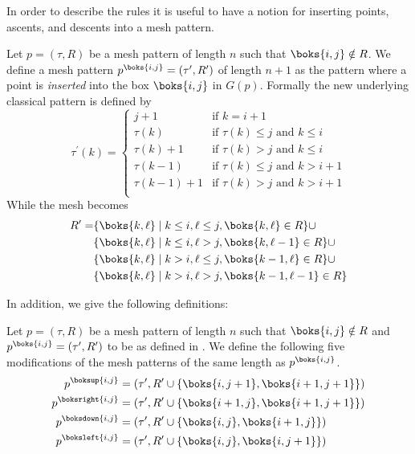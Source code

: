 In order to describe the rules it is useful to have a notion for inserting points, ascents, and
descents into a mesh pattern.
\begin{definition}
\label{def:ap}
Let \(p=(\tau,R)\) be a mesh pattern of length \(n\) such that \(\boks{i,j}\notin R\). We define
a mesh pattern \(p^\boks{i,j} = (\tau^\prime,R^\prime)\) of length \(n+1\) as the pattern where a
point is \emph{inserted} into the box \(\boks{i,j}\) in \(G(p)\). Formally the new underlying
classical pattern is defined by
\begin{equation*}
\tau^\prime(k) = \begin{cases}
    j+1 & \text{if } k = i+1\\
    \tau(k) & \text{if } \tau(k)\le j \text{ and }k\le i\\
    \tau(k)+1 & \text{if } \tau(k)> j \text{ and }k\le i\\
    \tau(k-1) & \text{if } \tau(k)\le j \text{ and }k> i+1\\
    \tau(k-1)+1 & \text{if } \tau(k)> j \text{ and }k> i+1\\
\end{cases}
\end{equation*}
While the mesh becomes
\begin{equation*}
\begin{aligned}
R^\prime=&\{\boks{k,\ell}\mid k\le i, \ell\le j, \boks{k,\ell}\in R\} \cup\\
&\{\boks{k,\ell}\mid k\le i, \ell > j, \boks{k,\ell-1}\in R\}\cup\\
&\{\boks{k,\ell}\mid k > i, \ell \le j, \boks{k-1,\ell}\in R\}\cup\\
&\{\boks{k,\ell}\mid k > i, \ell > j, \boks{k-1,\ell-1}\in R\}\\
\end{aligned}
\end{equation*}
\end{definition}
In addition, we give the following definitions:
\begin{definition}
Let \(p=(\tau,R)\) be a mesh pattern of length \(n\) such that \(\boks{i,j}\notin R\) and
\(p^\boks{i,j} = (\tau^\prime,R^\prime)\) to be as defined in . We define
the following five modifications of the mesh patterns of the same length as \(p^\boks{i,j}\).
\begin{align*}
p^\boksup{i,j} &= (\tau^\prime, R^\prime \cup \{\boks{i,j+1},\boks{i+1,j+1}\})\\
p^\boksright{i,j} &= (\tau^\prime, R^\prime \cup \{\boks{i+1,j},\boks{i+1,j+1}\})\\
p^\boksdown{i,j} &= (\tau^\prime, R^\prime \cup \{\boks{i,j},\boks{i+1,j}\})\\
p^\boksleft{i,j} &= (\tau^\prime, R^\prime \cup \{\boks{i,j},\boks{i,j+1}\})\\
\end{align*}
\end{definition}
